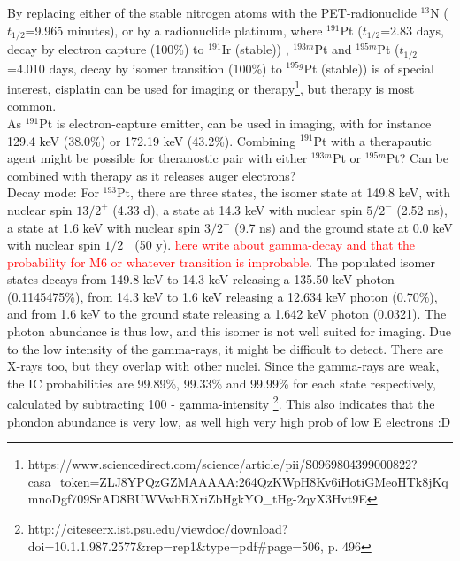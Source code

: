 \documentclass[a4paper,11pt,twoside]{book}
\begin{document}
By replacing either of the stable nitrogen atoms with the PET-radionuclide $^{13}$N ($t_{1/2}$=9.965 minutes), or by a radionuclide platinum, where $^{191}$Pt ($t_{1/2}$=2.83 days, decay by electron capture (100\%) to $^{191}$Ir (stable)) , $^{193m}$Pt and $^{195m}$Pt ($t_{1/2}$=4.010 days, decay by isomer transition (100\%) to $^{195g}$Pt (stable)) is of special interest, cisplatin can be used for imaging or therapy\footnote{https://www.sciencedirect.com/science/article/pii/S0969804399000822?casa_token=ZLJ8YPQzGZMAAAAA:264QzKWpH8Kv6iHotiGMeoHTk8jKqmnoDgf709SrAD8BUWVwbRXriZbHgkYO_tHg-2qyX3Hvt9E}, but therapy is most common. \\ 

\noindent 
As $^{191}$Pt is electron-capture emitter, can be used in imaging, with for instance 129.4 keV (38.0\%) or 172.19 keV (43.2\%). Combining $^{191}$Pt with a therapautic agent might be possible for theranostic pair with either $^{193m}$Pt or $^{195m}$Pt? Can be combined with therapy as it releases auger electrons? \\

\noindent
Decay mode: For $^{193}$Pt, there are three states, the isomer state at 149.8 keV, with nuclear spin $13/2^+$ (4.33 d), a state at 14.3 keV with nuclear spin $5/2^-$ (2.52 ns), a state at 1.6 keV with nuclear spin $3/2^-$ (9.7 ns) and the ground state at 0.0 keV with nuclear spin $1/2^-$ (50 y). \textcolor{red}{here write about gamma-decay and that the probability for M6 or whatever transition is improbable}. The populated isomer states decays from 149.8 keV to 14.3 keV releasing a 135.50 keV photon (0.1145475\%), from 14.3 keV to 1.6 keV releasing a 12.634 keV photon (0.70\%), and from 1.6 keV to the ground state releasing a 1.642 keV photon (0.0321). The photon abundance is thus low, and this isomer is not well suited for imaging. Due to the low intensity of the gamma-rays, it might be difficult to detect. There are X-rays too, but they overlap with other nuclei. Since the gamma-rays are weak, the IC probabilities are 99.89\%, 99.33\% and 99.99\% for each state respectively, calculated by subtracting 100 - gamma-intensity \footnote{http://citeseerx.ist.psu.edu/viewdoc/download?doi=10.1.1.987.2577&rep=rep1&type=pdf#page=506, p. 496}. This also indicates that the phondon abundance is very low, as well  high very high prob of low E electrons :D 
\end{document}
